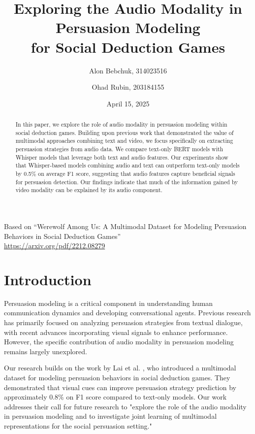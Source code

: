 \documentclass{article}
\title{Exploring the Audio Modality in Persuasion Modeling\\
for Social Deduction Games}
\author{Alon Bebchuk, 314023516 \and Ohad Rubin, 203184155}
\date{April 15, 2025}
\begin{document}
\maketitle

\begin{center}
\small{Based on ``Werewolf Among Us: A Multimodal Dataset for Modeling Persuasion Behaviors in Social Deduction Games''}\\
\small{\url{https://arxiv.org/pdf/2212.08279}}
\end{center}

\begin{abstract}
In this paper, we explore the role of audio modality in persuasion modeling within social deduction games. Building upon previous work that demonstrated the value of multimodal approaches combining text and video, we focus specifically on extracting persuasion strategies from audio data. We compare text-only BERT models with Whisper models that leverage both text and audio features. Our experiments show that Whisper-based models combining audio and text can outperform text-only models by 0.5\% on average F1 score, suggesting that audio features capture beneficial signals for persuasion detection. Our findings indicate that much of the information gained by video modality can be explained by its audio component.
\end{abstract}

\section{Introduction}
Persuasion modeling is a critical component in understanding human communication dynamics and developing conversational agents. Previous research has primarily focused on analyzing persuasion strategies from textual dialogue, with recent advances incorporating visual signals to enhance performance. However, the specific contribution of audio modality in persuasion modeling remains largely unexplored.

Our research builds on the work by Lai et al. \cite{lai2022werewolf}, who introduced a multimodal dataset for modeling persuasion behaviors in social deduction games. They demonstrated that visual cues can improve persuasion strategy prediction by approximately 0.8\% on F1 score compared to text-only models. Our work addresses their call for future research to "explore the role of the audio modality in persuasion modeling and to investigate joint learning of multimodal representations for the social persuasion setting."
\end{document}
